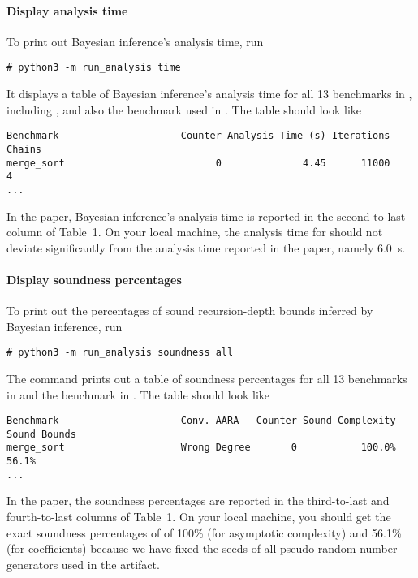 \paragraph{Display analysis time}

To print out Bayesian inference's analysis time, run
\begin{verbatim}
# python3 -m run_analysis time
\end{verbatim}
%
It displays a table of Bayesian inference's analysis time for all 13 benchmarks
in , including \mergesort{}, and also
the benchmark \quicksorttiml{} used in .
%
The table should look like
\begin{verbatim}
Benchmark                     Counter Analysis Time (s) Iterations Chains
merge_sort                          0              4.45      11000      4
...
\end{verbatim}

In the paper, Bayesian inference's analysis time is reported in the
second-to-last column of Table~1.
%
On your local machine, the analysis time for \mergesort{} should not deviate
significantly from the analysis time reported in the paper, namely
\qty{6.0}{\second}.

\paragraph{Display soundness percentages}

To print out the percentages of sound recursion-depth bounds inferred by
Bayesian inference, run
\begin{verbatim}
# python3 -m run_analysis soundness all
\end{verbatim}
%
The command prints out a table of soundness percentages for all 13 benchmarks in
 and the benchmark \quicksorttiml{} in
.
%
The table should look like
\begin{verbatim}
Benchmark                     Conv. AARA   Counter Sound Complexity  Sound Bounds
merge_sort                    Wrong Degree       0           100.0%         56.1%
...
\end{verbatim}

In the paper, the soundness percentages are reported in the third-to-last and
fourth-to-last columns of Table~1.
%
On your local machine, you should get the exact soundness percentages of
\mergesort{} of 100\% (for asymptotic complexity) and  56.1\% (for coefficients)
because we have fixed the seeds of all pseudo-random number generators used in
the artifact.


